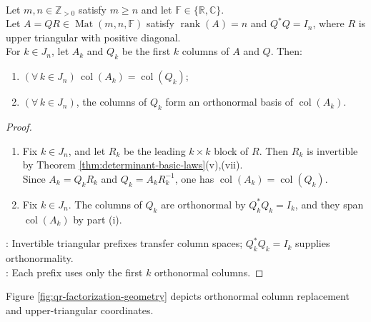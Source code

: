 \begin{corollary} \label{cor:qr-prefix-column-spaces} \\
Let $m,n\in\mathbb{Z}_{>0}$ satisfy $m\geq n$ and let $\mathbb{F}\in\{\mathbb{R},\mathbb{C}\}$.\\
Let $A=QR\in\operatorname{Mat}(m,n,\mathbb{F})$ satisfy $\operatorname{rank}(A)=n$ and $Q^*Q=I_n$, where $R$ is upper triangular with positive diagonal.\\
For $k\in J_n$, let $A_k$ and $Q_k$ be the first $k$ columns of $A$ and $Q$. Then:
\begin{enumerate}[label=(\roman*)]
\setlength{\itemsep}{0pt}
\item $(\forall\,k\in J_n)\,\operatorname{col}(A_k)=\operatorname{col}(Q_k)$;
\item $(\forall\,k\in J_n)$, the columns of $Q_k$ form an orthonormal basis of $\operatorname{col}(A_k)$.
\end{enumerate}
\begin{proof}
\begin{enumerate}[label=(\roman*)]
\setlength{\itemsep}{0pt}
\item Fix $k\in J_n$, and let $R_k$ be the leading $k\times k$ block of $R$. Then $R_k$ is invertible by Theorem \ref{thm:determinant-basic-laws}(v),(vii).\\
Since $A_k=Q_kR_k$ and $Q_k=A_kR_k^{-1}$, one has $\operatorname{col}(A_k)=\operatorname{col}(Q_k)$.
\item Fix $k\in J_n$. The columns of $Q_k$ are orthonormal by $Q_k^*Q_k=I_k$, and they span $\operatorname{col}(A_k)$ by part (i).
\end{enumerate}
: Invertible triangular prefixes transfer column spaces; $Q_k^*Q_k=I_k$ supplies orthonormality.\\
: Each prefix uses only the first $k$ orthonormal columns.
\end{proof}
\end{corollary}

Figure \ref{fig:qr-factorization-geometry} depicts orthonormal column replacement and upper-triangular coordinates.

\begin{illustrationfigure}[H]
  \centering
  
  \caption{QR records the original columns in an orthonormal basis while preserving every prefix column space.}
  \label{fig:qr-factorization-geometry}
\end{illustrationfigure}

